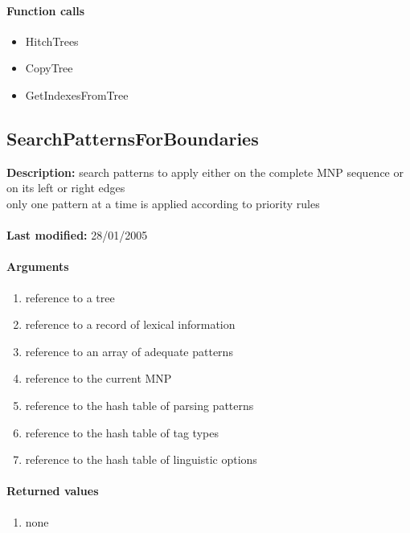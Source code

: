 \paragraph{Function calls}
\begin{itemize}
\item HitchTrees
\item CopyTree
\item GetIndexesFromTree
\end{itemize}

\subsection{SearchPatternsForBoundaries}
\textbf{Description:} search patterns to apply either on the complete MNP sequence or on its left or right edges \\
only one pattern at a time is applied according to priority rules\\
\\\textbf{Last modified:} 28/01/2005

\paragraph{Arguments}
\begin{enumerate}
\item reference to a tree
\item reference to a record of lexical information
\item reference to an array of adequate patterns
\item reference to the current MNP
\item reference to the hash table of parsing patterns
\item reference to the hash table of tag types
\item reference to the hash table of linguistic options
\end{enumerate}

\paragraph{Returned values}
\begin{enumerate}
\item none
\end{enumerate}

